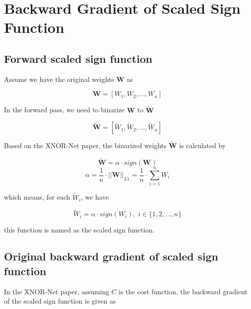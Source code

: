 \documentclass[12pt]{article} %
\begin{document}

\section{Backward Gradient of Scaled Sign Function} %
\subsection{Forward scaled sign function}
Assume we have the original weights $\mathbf{W}$ as

\begin{equation}
	\mathbf{W}=[W_{1},W_{2}, ..., W_{n}]
\end{equation}

In the forward pass, we need to binarize $\mathbf{W}$ to $\mathbf{\widetilde{W}}$

\begin{equation}
	\mathbf{\widetilde{W}}=[\widetilde{W}_{1},\widetilde{W}_{2}, ..., \widetilde{W}_{n}]
\end{equation}

Based on the XNOR-Net paper, the binarized weights $\mathbf{\widetilde{W}}$ is calculated by

\begin{equation}
	\mathbf{\widetilde{W}}=\alpha \cdot sign(\mathbf{W})
\end{equation}
\begin{equation}
	\alpha = \frac{1}{n} \cdot {||\mathbf{W}||}_{L1} = \frac{1}{n} \cdot
	\sum_{i=1}^{n} W_{i}
\end{equation}

which means, for each $\widetilde{W}_{i}$, we have

\begin{equation}
	\widetilde{W}_{i} =\alpha \cdot sign(W_{i}), \; i \in \{1,2,...,n\}
\end{equation}

this function is named as the scaled sign function.


\subsection{Original backward gradient of scaled sign function}
In the XNOR-Net paper, assuming $C$ is the cost function, the backward gradient of the scaled sign function is given as
\end{document}
